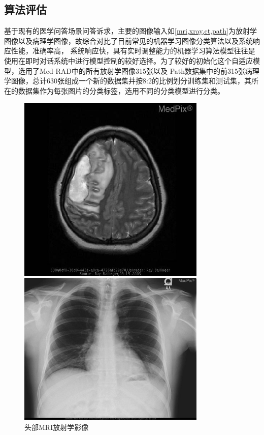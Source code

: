 \subsection{算法评估}
基于现有的医学问答场景问答诉求，主要的图像输入如\ref{mri,xray,ct,path}为放射学图像以及病理学图像，故综合对比了目前常见的机器学习图像分类算法以及系统响应性能，准确率高，
系统响应快，具有实时调整能力的机器学习算法模型往往是使用在即时对话系统中进行模型控制的较好选择。为了较好的初始化这个自适应模型，选用了Med-RAD中的所有放射学图像315张以及
Path数据集中的前315张病理学图像，总计630张组成一个新的数据集并按8:2的比例划分训练集和测试集，其所在的数据集作为每张图片的分类标签，选用不同的分类模型进行分类。
\begin{figure}[htbp]
	\begin{minipage}{0.5\linewidth}
		\centering	
		\includegraphics[width=0.8\textwidth]{Fig/myfig/chapter5/data_radmri.jpg}  %
		\caption{\label{mri}头部MRI放射学影像} 	
	\end{minipage}
	\begin{minipage}{0.5\linewidth}
		\centering	
		\includegraphics[width=0.8\textwidth]{Fig/myfig/chapter5/data_radXray.jpg}  %

\end{minipage}
\end{figure}
